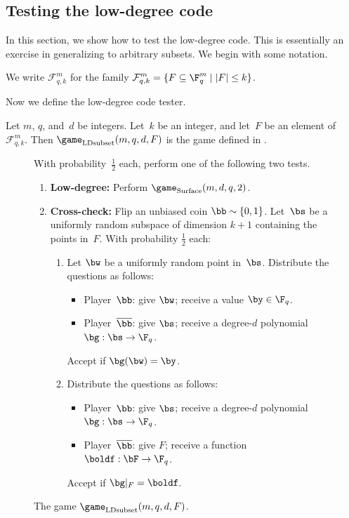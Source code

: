 \subsection{Testing the low-degree code}\label{sec:testing-low-deg}

In this section, we show how to test the low-degree code.
This is essentially an exercise in generalizing  to arbitrary subsets.
We begin with some notation.

\begin{notation}
We write $\mathcal{F}_{q, k}^{m}$ for the family
$\displaystyle
\mathcal{F}^m_{q, k} = \{F \subseteq \F_q^m \mid |F| \leq k\}
$.
\end{notation}

Now we define the low-degree code tester.

\begin{definition}
Let $m$, $q$, and~$d$ be integers.  Let~$k$ be an integer, and let~$F$ be an element of~$\mathcal{F}^m_{q, k}$.
Then $\game_{\mathrm{LDsubset}}(m, q, d, F)$ is the game defined in .
\end{definition}

{
\begin{figure}
With probability~$\tfrac{1}{2}$ each, perform one of the following two tests.
\begin{enumerate}
	\item \textbf{Low-degree:} Perform $\game_{\mathrm{Surface}}(m, d, q,2)$. \label{item:low-deg-point}
	\item \textbf{Cross-check:}
			Flip an unbiased coin $\bb \sim \{0, 1\}$.
			Let~$\bs$ be a uniformly random subspace of dimension $k+1$ containing the points in~$F$.
			 With probability $\tfrac{1}{2}$ each:
			\begin{enumerate}
			\item Let $\bw$ be a uniformly random point in~$\bs$. Distribute the questions as follows:\label{item:bootstrapping-to-subspaces}
				\begin{itemize}
				\item[$\circ$] Player~$\bb$: give $\bw$; receive a value $\by \in \F_q$.
				\item[$\circ$] Player~$\overline{\bb}$: give $\bs$; receive a degree-$d$ polynomial $\bg:\bs \rightarrow \F_q$.
				\end{itemize}
				Accept if $\bg(\bw) = \by$.
			\item Distribute the questions as follows: \label{item:boosting-to-subsets}
				\begin{itemize}
				\item[$\circ$] Player~$\bb$: give $\bs$; receive a degree-$d$ polynomial $\bg:\bs \rightarrow \F_q$.
				\item[$\circ$] Player~$\overline{\bb}$: give $F$; receive a function $\boldf:\bF \rightarrow \F_q$.
				\end{itemize}
				Accept if $\bg|_{F} = \boldf$.
			\end{enumerate}
	\end{enumerate}
	\caption{The game $\game_{\mathrm{LDsubset}}(m, q, d, F)$. \label{fig:classical-subset}}
\end{figure}
}

